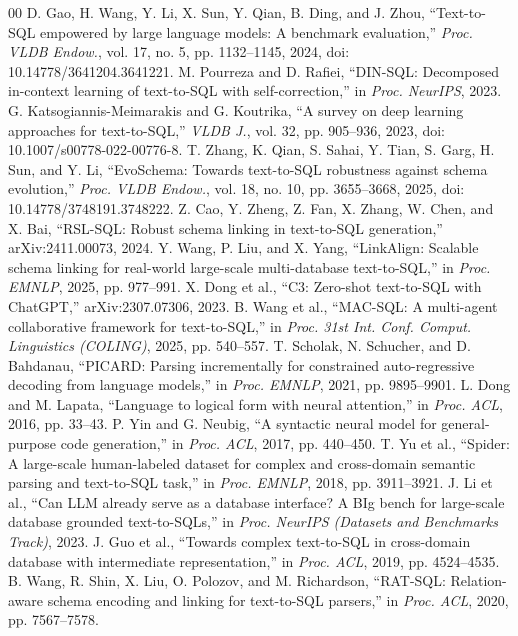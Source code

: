 \begin{thebibliography}{00}
 D. Gao, H. Wang, Y. Li, X. Sun, Y. Qian, B. Ding, and J. Zhou, ``Text-to-SQL empowered by large language models: A benchmark evaluation,'' \emph{Proc. VLDB Endow.}, vol. 17, no. 5, pp. 1132--1145, 2024, doi: 10.14778/3641204.3641221.
 M. Pourreza and D. Rafiei, ``DIN-SQL: Decomposed in-context learning of text-to-SQL with self-correction,'' in \emph{Proc. NeurIPS}, 2023.
 G. Katsogiannis-Meimarakis and G. Koutrika, ``A survey on deep learning approaches for text-to-SQL,'' \emph{VLDB J.}, vol. 32, pp. 905--936, 2023, doi: 10.1007/s00778-022-00776-8.
 T. Zhang, K. Qian, S. Sahai, Y. Tian, S. Garg, H. Sun, and Y. Li, ``EvoSchema: Towards text-to-SQL robustness against schema evolution,'' \emph{Proc. VLDB Endow.}, vol. 18, no. 10, pp. 3655--3668, 2025, doi: 10.14778/3748191.3748222.
 Z. Cao, Y. Zheng, Z. Fan, X. Zhang, W. Chen, and X. Bai, ``RSL-SQL: Robust schema linking in text-to-SQL generation,'' arXiv:2411.00073, 2024.
 Y. Wang, P. Liu, and X. Yang, ``LinkAlign: Scalable schema linking for real-world large-scale multi-database text-to-SQL,'' in \emph{Proc. EMNLP}, 2025, pp. 977--991.
 X. Dong et al., ``C3: Zero-shot text-to-SQL with ChatGPT,'' arXiv:2307.07306, 2023.
 B. Wang et al., ``MAC-SQL: A multi-agent collaborative framework for text-to-SQL,'' in \emph{Proc. 31st Int. Conf. Comput. Linguistics (COLING)}, 2025, pp. 540--557.
 T. Scholak, N. Schucher, and D. Bahdanau, ``PICARD: Parsing incrementally for constrained auto-regressive decoding from language models,'' in \emph{Proc. EMNLP}, 2021, pp. 9895--9901.
 L. Dong and M. Lapata, ``Language to logical form with neural attention,'' in \emph{Proc. ACL}, 2016, pp. 33--43.
 P. Yin and G. Neubig, ``A syntactic neural model for general-purpose code generation,'' in \emph{Proc. ACL}, 2017, pp. 440--450.
 T. Yu et al., ``Spider: A large-scale human-labeled dataset for complex and cross-domain semantic parsing and text-to-SQL task,'' in \emph{Proc. EMNLP}, 2018, pp. 3911--3921.
 J. Li et al., ``Can LLM already serve as a database interface? A BIg bench for large-scale database grounded text-to-SQLs,'' in \emph{Proc. NeurIPS (Datasets and Benchmarks Track)}, 2023.
 J. Guo et al., ``Towards complex text-to-SQL in cross-domain database with intermediate representation,'' in \emph{Proc. ACL}, 2019, pp. 4524--4535.
 B. Wang, R. Shin, X. Liu, O. Polozov, and M. Richardson, ``RAT-SQL: Relation-aware schema encoding and linking for text-to-SQL parsers,'' in \emph{Proc. ACL}, 2020, pp. 7567--7578.

\end{thebibliography}
